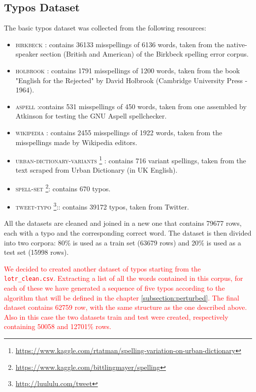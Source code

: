 \subsection{Typos Dataset}
The basic typos dataset was collected from the following resources:
\begin{itemize}
	\item \textsc{birkbeck}  : contains 
	\num{36133} misspellings of \num{6136} words, taken from the native-speaker section (British and 
	American) of the Birkbeck spelling error corpus.
	\item \textsc{holbrook} : contains \num{1791} misspellings of \num{1200} words, taken from 
	the book "English for the Rejected" by David Holbrook (Cambridge University Press - 1964).
	\item \textsc{aspell}  :contains \num{531} misspellings of \num{450} words, taken from one 
	assembled by Atkinson for testing the GNU Aspell spellchecker.
	\item \textsc{wikipedia} : contains \num{2455} misspellings of \num{1922} words, taken from 
	the misspellings made by Wikipedia editors.
	\item \textsc{urban-dictionary-variants} 
	\footnote{\url{https://www.kaggle.com/rtatman/spelling-variation-on-urban-dictionary}}  : contains 
	\num{716} variant 
	spellings, taken from the text scraped from Urban Dictionary (in UK English).
	\item \textsc{spell-set} \footnote{\url{https://www.kaggle.com/bittlingmayer/spelling}}: contains 
	\num{670} typos.
	\item \textsc{tweet-typo} \footnote{\url{http://luululu.com/tweet}}:: contains \num{39172} typos, taken 
	from Twitter.
\end{itemize}

All the datasets are cleaned and joined in a new one that contains \num{79677} rows, each with a typo and the 
corresponding correct word.
The dataset is then divided into two corpora: \num{80}\% is used as a train set (\num{63679} rows) and 
\num{20}\% is used as a test set (\num{15998} rows).


\textcolor{red}{
	We decided to created another dataset of typos starting from the \\\texttt{lotr\_clean.csv}. 
	Extracting a list of all the words contained in this corpus, for each of these we have generated a sequence of 
	five typos according to the algorithm that will be defined in the chapter \ref{subsection:perturbed}.
	The final dataset contains \num{62759} row, with the same structure as the one described above.
	Also in this case the two datasets train and test were created, respectively containing \num{50058} and 
	\num{12701}\% rows.}

